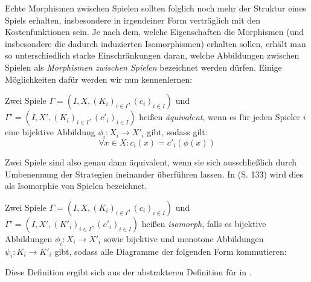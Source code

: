 Echte Morphismen zwischen Spielen sollten folglich noch mehr der Struktur eines Spiels erhalten, insbesondere in irgendeiner Form \glqq verträglich\grqq{} mit den Kostenfunktionen sein. Je nach dem, welche Eigenschaften die Morphismen (und insbesondere die dadurch induzierten Isomorphismen) erhalten sollen, erhält man so unterschiedlich starke Einschränkungen daran, welche Abbildungen zwischen Spielen als \emph{Morphismen zwischen Spielen} bezeichnet werden dürfen. Einige Möglichkeiten dafür werden wir nun kennenlernen:

\begin{defn}
	Zwei Spiele $\Gamma = (I, X, (K_i)_{i\in I}, (c_i)_{i\in I})$ und $\Gamma' = (I, X', (K_i)_{i\in I}, (c'_i)_{i\in I})$ heißen \emph{äquivalent}, wenn es für jeden Spieler $i$ eine bijektive Abbildung $\phi_i: X_i \to X'_i$ gibt, sodass gilt:
		\[\forall x \in X: c_i(x) = c'_i(\phi(x)) \]
\end{defn}

\begin{bem}
	Zwei Spiele sind also genau dann äquivalent, wenn sie sich ausschließlich durch Umbenennung der Strategien ineinander überführen lassen. In \cite{MonShap} (S. 133) wird dies als Isomorphie von Spielen bezeichnet.
\end{bem}

\begin{defn}\label{def:SpielIsomLap}
	Zwei Spiele $\Gamma = (I, X, (K_i)_{i\in I}, (c_i)_{i\in I})$ und $\Gamma' = (I, X', (K'_i)_{i\in I}, (c'_i)_{i\in I})$ heißen \emph{isomorph}, falls es bijektive Abbildungen $\phi_i: X_i \to X'_i$ sowie bijektive und monotone Abbildungen $\psi_i: K_i \to K'_i$ gibt, sodass alle Diagramme der folgenden Form kommutieren:
	
	\begin{center}
	\end{center}
\end{defn}

\begin{bem}\label{bem:LapMorDef}
	Diese Definition ergibt sich aus der abstrakteren Definition für  in \cite{LapGameCat}. 
	
\end{bem}

